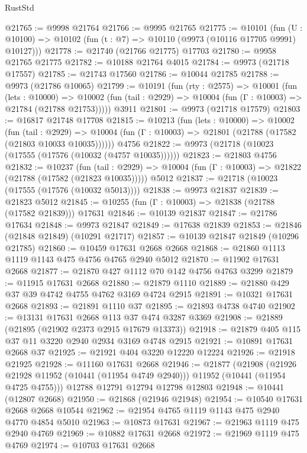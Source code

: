 \begin{lexlean}{RustStd}
\begin{coremodule}
@21765 := @9998 @21764
@21766 := @9995 @21765
@21775 := @10101
    (fun (U : @10100) => @10102 (fun (t : @7) => @10110 (@9973 (@10116 @17705 @9991) @10127)))
@21778 := @21740 (@21766 @21775) @17703
@21780 := @9958 @21765 @21775
@21782 := @10188 @21764 @4015
@21784 := @9973 (@21718 @17557)
@21785 := @21743 @17560
@21786 := @10044 @21785
@21788 := @9973 (@21786 @10065)
@21799 := @10191
    (fun (rty : @2575) =>
    @10001
      (fun (lets : @10000) =>
      @10002 (fun (tail : @2929) => @10004 (fun (Γ : @10003) => @21784 (@21788 @21753)))))
    @3911
@21801 := @9973 (@21718 @17579)
@21803 := @16817 @21748 @17708
@21815 := @10213
    (fun (lets : @10000) =>
    @10002
      (fun (tail : @2929) =>
      @10004 (fun (Γ : @10003) => @21801 (@21788 (@17582 (@21803 @10033 @10035))))))
    @4756
@21822 := @9973 (@21718 (@10023 (@17555 (@17576 (@10032 (@4757 @10035))))))
@21823 := @21803 @4756
@21832 := @10237
    (fun (tail : @2929) => @10004 (fun (Γ : @10003) => @21822 (@21788 (@17582 (@21823 @10035)))))
    @5012
@21837 := @21718 (@10023 (@17555 (@17576 (@10032 @5013))))
@21838 := @9973 @21837
@21839 := @21823 @5012
@21845 := @10255 (fun (Γ : @10003) => @21838 (@21788 (@17582 @21839))) @17631
@21846 := @10139 @21837
@21847 := @21786 @17634
@21848 := @9973 @21847
@21849 := @17638 @21839
@21853 := @21846 (@21848 @21849) (@10291 @21717)
@21857 := @10139 @21847 @21849 (@10296 @21785)
@21860 := @10459 @17631 @2668 @2668
@21868 := @21860 @1113 @1119 @1143 @475 @4756 @4765 @2940 @5012
@21870 := @11902 @17631 @2668
@21877 := @21870 @427 @1112 @70 @142 @4756 @4763 @3299
@21879 := @11915 @17631 @2668
@21880 := @21879 @1110
@21889 := @21880 @429 @37 @39 @4742 @4755 @4762 @3169 @4724 @2915
@21891 := @10321 @17631 @2668
@21893 := @21891 @1110 @37
@21895 := @21893 @4738 @4740
@21902 := @13131 @17631 @2668 @113 @37 @474 @3287 @3369
@21908 := @21889 (@21895 (@21902 @2373 @2915 @17679 @13373))
@21918 := @21879 @405 @115 @37 @11 @3220 @2940 @2934 @3169 @4748 @2915
@21921 := @10891 @17631 @2668 @37
@21925 := @21921 @404 @3220 @12220 @12224
@21926 := @21918 @21925
@21928 := @11160 @17631 @2668
@21946 := @21877
    (@21908
      (@21926 @21928 @11952 (@10441 (@11954 @4749 @2940)))
      @11952
      (@10441 (@11954 @4725 @4755)))
    @12788
    @12791
    @12794
    @12798
    @12803
@21948 := @10441 (@12807 @2668)
@21950 := @21868 (@21946 @21948)
@21954 := @10540 @17631 @2668 @2668 @10544
@21962 := @21954 @4765 @1119 @1143 @475 @2940 @4770 @4854 @5010
@21963 := @10873 @17631
@21967 := @21963 @1119 @475 @2940 @4769
@21969 := @10882 @17631 @2668
@21972 := @21969 @1119 @475 @4769
@21974 := @10703 @17631 @2668

\end{coremodule}
\end{lexlean}
